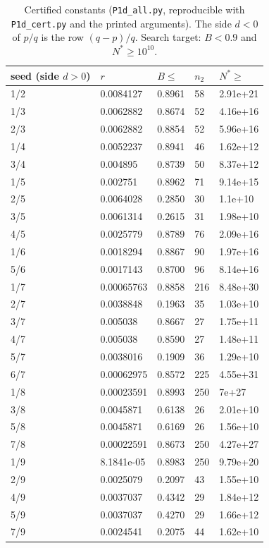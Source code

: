 \documentclass[11pt]{article}
\theoremstyle{definition}\newtheorem{definition}[theorem]{Definition}
\theoremstyle{remark}\newtheorem{remark}[theorem]{Remark}
\begin{document}
\begin{table}[h]\centering\small
\caption{Certified constants (\texttt{P1d\_all.py}, reproducible with \texttt{P1d\_cert.py} and the printed arguments). The side $d<0$ of $p/q$ is the row $(q-p)/q$. Search target: $B<0.9$ and $N^*\ge10^{10}$.}\label{tab:cert}
\begin{tabular}{lllll}\toprule
seed (side $d>0$) & $r$ & $B\le$ & $n_2$ & $N^*\ge$\\\midrule
1/2 & 0.0084127 & 0.8961 & 58 & 2.91e+21\\
1/3 & 0.0062882 & 0.8674 & 52 & 4.16e+16\\
2/3 & 0.0062882 & 0.8854 & 52 & 5.96e+16\\
1/4 & 0.0052237 & 0.8941 & 46 & 1.62e+12\\
3/4 & 0.004895 & 0.8739 & 50 & 8.37e+12\\
1/5 & 0.002751 & 0.8962 & 71 & 9.14e+15\\
2/5 & 0.0064028 & 0.2850 & 30 & 1.1e+10\\
3/5 & 0.0061314 & 0.2615 & 31 & 1.98e+10\\
4/5 & 0.0025779 & 0.8789 & 76 & 2.09e+16\\
1/6 & 0.0018294 & 0.8867 & 90 & 1.97e+16\\
5/6 & 0.0017143 & 0.8700 & 96 & 8.14e+16\\
1/7 & 0.00065763 & 0.8858 & 216 & 8.48e+30\\
2/7 & 0.0038848 & 0.1963 & 35 & 1.03e+10\\
3/7 & 0.005038 & 0.8667 & 27 & 1.75e+11\\
4/7 & 0.005038 & 0.8590 & 27 & 1.48e+11\\
5/7 & 0.0038016 & 0.1909 & 36 & 1.29e+10\\
6/7 & 0.00062975 & 0.8572 & 225 & 4.55e+31\\
1/8 & 0.00023591 & 0.8993 & 250 & 7e+27\\
3/8 & 0.0045871 & 0.6138 & 26 & 2.01e+10\\
5/8 & 0.0045871 & 0.6169 & 26 & 1.56e+10\\
7/8 & 0.00022591 & 0.8673 & 250 & 4.27e+27\\
1/9 & 8.1841e-05 & 0.8983 & 250 & 9.79e+20\\
2/9 & 0.0025079 & 0.2097 & 43 & 1.55e+10\\
4/9 & 0.0037037 & 0.4342 & 29 & 1.84e+12\\
5/9 & 0.0037037 & 0.4270 & 29 & 1.66e+12\\
7/9 & 0.0024541 & 0.2075 & 44 & 1.62e+10\\

\end{tabular}
\end{table}
\end{document}
